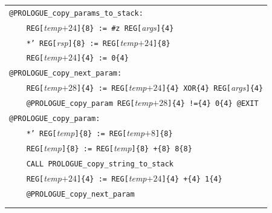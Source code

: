\documentclass[10pt,twocolumn]{article}
\begin{document}
\begin{table}[!h]
\begin{center}
\begin{tabular}{l}
\texttt{@PROLOGUE\_copy\_params\_to\_stack:}\\ %
\texttt{~~~~REG[}\textit{temp}$ +24 $\texttt{]\{8\} := \#z
REG[}\textit{args}\texttt{]\{4\} }\\ %
\texttt{~~~~*' REG[}\textit{rsp}\texttt{]\{8\} := REG[}\textit{temp}$ +24
$\texttt{]\{8\} }\\ %
\texttt{~~~~REG[}\textit{temp}$ +24 $\texttt{]\{4\} := 0\{4\}}\\ %
\texttt{@PROLOGUE\_copy\_next\_param:}\\ %
\texttt{~~~~REG[}\textit{temp}$ +28 $\texttt{]\{4\} := REG[}\textit{temp}$ +24
$\texttt{]\{4\} XOR\{4\} REG[}\textit{args}\texttt{]\{4\}}\\ %
\texttt{~~~~@PROLOGUE\_copy\_param REG[}\textit{temp}$ +28 $\texttt{]\{4\}
!=\{4\} 0\{4\} @EXIT}\\ %
\texttt{@PROLOGUE\_copy\_param:}\\ %
\texttt{~~~~*' REG[}\textit{temp}\texttt{]\{8\} := REG[}\textit{temp}$ +8
$\texttt{]\{8\} }\\ %
\texttt{~~~~REG[}\textit{temp}\texttt{]\{8\} := REG[}\textit{temp}\texttt{]\{8\}
+\{8\} 8\{8\}}\\ %
\texttt{~~~~CALL PROLOGUE\_copy\_string\_to\_stack}\\ %
\texttt{~~~~REG[}\textit{temp}$ +24 $\texttt{]\{4\} := REG[}\textit{temp}$ +24
$\texttt{]\{4\} +\{4\} 1\{4\}}\\ %
\texttt{~~~~@PROLOGUE\_copy\_next\_param}\\ %
\\ \\



\end{tabular}
\end{center}
\end{table}
\end{document}
